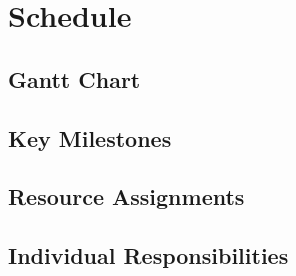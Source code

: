 \section{Schedule}

\subsection{Gantt Chart}
\subsection{Key Milestones}
\subsection{Resource Assignments}
\subsection{Individual Responsibilities}
